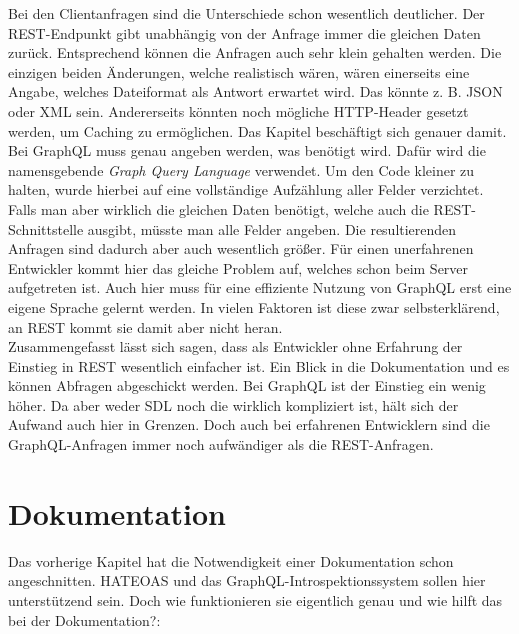 Bei den Clientanfragen sind die Unterschiede schon wesentlich deutlicher. Der REST-Endpunkt gibt unabhängig von der Anfrage immer die gleichen Daten zurück. Entsprechend können die Anfragen auch sehr klein gehalten werden. Die einzigen beiden Änderungen, welche realistisch wären, wären einerseits eine Angabe, welches Dateiformat als Antwort erwartet wird. Das könnte z. B. JSON oder XML sein. Andererseits könnten noch mögliche HTTP-Header gesetzt werden, um Caching zu ermöglichen. Das Kapitel  beschäftigt sich genauer damit. Bei GraphQL muss genau angeben werden, was benötigt wird. Dafür wird die namensgebende \textit{Graph Query Language} verwendet. Um den Code kleiner zu halten, wurde hierbei auf eine vollständige Aufzählung aller Felder verzichtet. Falls man aber wirklich die gleichen Daten benötigt, welche auch die REST-Schnittstelle ausgibt, müsste man alle Felder angeben. Die resultierenden Anfragen sind dadurch aber auch wesentlich größer. Für einen unerfahrenen Entwickler kommt hier das gleiche Problem auf, welches schon beim Server aufgetreten ist. Auch hier muss für eine effiziente Nutzung von GraphQL erst eine eigene Sprache gelernt werden. In vielen Faktoren ist diese zwar selbsterklärend, an \ac{REST} kommt sie damit aber nicht heran.\\
Zusammengefasst lässt sich sagen, dass als Entwickler ohne Erfahrung der Einstieg in \ac{REST} wesentlich einfacher ist. Ein Blick in die Dokumentation und es können Abfragen abgeschickt werden. Bei GraphQL ist der Einstieg ein wenig höher. Da aber weder \ac{SDL} noch die  wirklich kompliziert ist, hält sich der Aufwand auch hier in Grenzen. Doch auch bei erfahrenen Entwicklern sind die GraphQL-Anfragen immer noch aufwändiger als die REST-Anfragen.

\section{Dokumentation}\label{dokumentation}

Das vorherige Kapitel hat die Notwendigkeit einer Dokumentation schon angeschnitten. \ac{HATEOAS} und das GraphQL-Introspektionssystem sollen hier unterstützend sein. Doch wie funktionieren sie eigentlich genau und wie hilft das bei der Dokumentation?:\\


